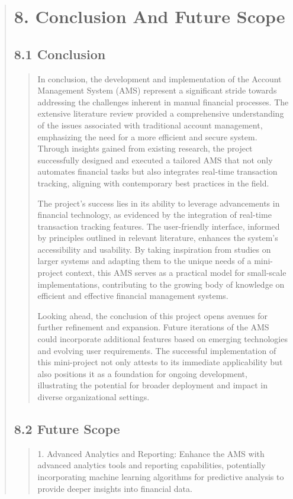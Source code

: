 \documentclass[12pt]{report}
\begin{document}
	
	\begin{quote}
		\section{8. Conclusion And Future Scope}
		\subsection{8.1 Conclusion}
		\begin{quote}
		In conclusion, the development and implementation of the Account Management System (AMS) represent a significant stride towards addressing the challenges inherent in manual financial processes. The extensive literature review provided a comprehensive understanding of the issues associated with traditional account management, emphasizing the need for a more efficient and secure system. Through insights gained from existing research, the project successfully designed and executed a tailored AMS that not only automates financial tasks but also integrates real-time transaction tracking, aligning with contemporary best practices in the field.
		
		The project's success lies in its ability to leverage advancements in financial technology, as evidenced by the integration of real-time transaction tracking features. The user-friendly interface, informed by principles outlined in relevant literature, enhances the system's accessibility and usability. By taking inspiration from studies on larger systems and adapting them to the unique needs of a mini-project context, this AMS serves as a practical model for small-scale implementations, contributing to the growing body of knowledge on efficient and effective financial management systems.
		
		Looking ahead, the conclusion of this project opens avenues for further refinement and expansion. Future iterations of the AMS could incorporate additional features based on emerging technologies and evolving user requirements. The successful implementation of this mini-project not only attests to its immediate applicability but also positions it as a foundation for ongoing development, illustrating the potential for broader deployment and impact in diverse organizational settings.
		\end{quote}
		\clearpage
		\subsection{8.2 Future Scope}
		\begin{quote}
		1. Advanced Analytics and Reporting: Enhance the AMS with advanced analytics tools and reporting capabilities, potentially incorporating machine learning algorithms for predictive analysis to provide deeper insights into financial data.
		

\end{quote}
\end{quote}
\end{document}
